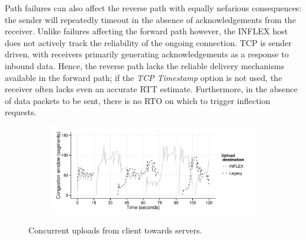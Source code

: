 Path failures can also affect the reverse path with equally nefarious consequences: the sender will repeatedly timeout in the absence of acknowledgements from the receiver.
Unlike failures affecting the forward path however, the INFLEX host does not actively track the reliability of the ongoing connection.
\ac{TCP} is sender driven, with receivers primarily generating acknowledgements as a response to inbound data. 
Hence, the reverse path lacks the reliable delivery mechanisms available in the forward path; if the \emph{\ac{TCP} Timestamp} option is not used, the receiver often lacks even an accurate RTT estimate.
Furthermore, in the absence of data packets to be sent, there is no \ac{RTO} on which to trigger inflection requests.

\begin{figure}
    \begin{subfigure}[b]{1.0\linewidth}
        \centering
        \includegraphics[width=5.0in]{figures/inflex/recv-cwnd.pdf}
    \end{subfigure}
    \caption{Concurrent uploads from client towards servers.\label{fig:receiver}}
\end{figure}

